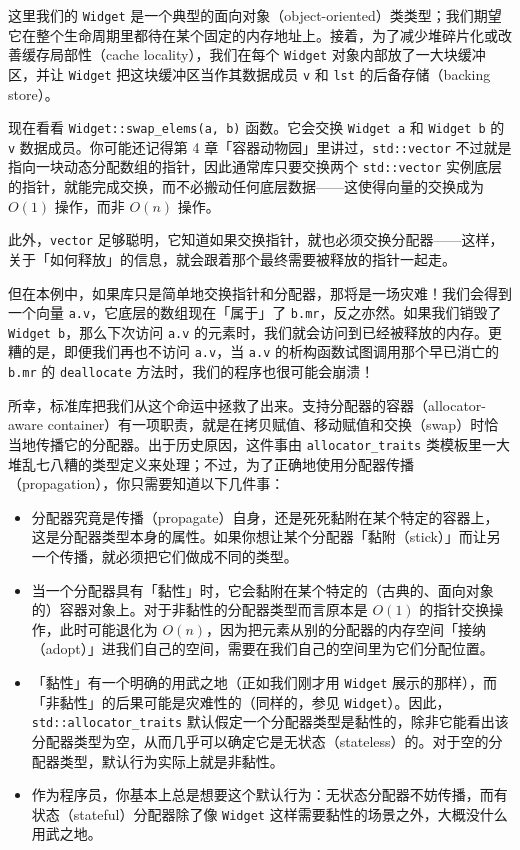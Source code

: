 这里我们的 \texttt{Widget} 是一个典型的面向对象（object-oriented）类类型；我们期望它在整个生命周期里都待在某个固定的内存地址上。接着，为了减少堆碎片化或改善缓存局部性（cache locality），我们在每个 \texttt{Widget} 对象内部放了一大块缓冲区，并让 \texttt{Widget} 把这块缓冲区当作其数据成员 \texttt{v} 和 \texttt{lst} 的后备存储（backing store）。

现在看看 \texttt{Widget::\allowbreak{}swap\_\allowbreak{}elems(\allowbreak{}a,\allowbreak{} b)\allowbreak{}} 函数。它会交换 \texttt{Widget a} 和 \texttt{Widget b} 的 \texttt{v} 数据成员。你可能还记得第 4 章「容器动物园」里讲过，\texttt{std::\allowbreak{}vector} 不过就是指向一块动态分配数组的指针，因此通常库只要交换两个 \texttt{std::\allowbreak{}vector} 实例底层的指针，就能完成交换，而不必搬动任何底层数据——这使得向量的交换成为 $O(1)$ 操作，而非 $O(n)$ 操作。

此外，\texttt{vector} 足够聪明，它知道如果交换指针，就也必须交换分配器——这样，关于「如何释放」的信息，就会跟着那个最终需要被释放的指针一起走。

但在本例中，如果库只是简单地交换指针和分配器，那将是一场灾难！我们会得到一个向量 \texttt{a.\allowbreak{}v}，它底层的数组现在「属于」了 \texttt{b.\allowbreak{}mr}，反之亦然。如果我们销毁了 \texttt{Widget b}，那么下次访问 \texttt{a.\allowbreak{}v} 的元素时，我们就会访问到已经被释放的内存。更糟的是，即便我们再也不访问 \texttt{a.\allowbreak{}v}，当 \texttt{a.\allowbreak{}v} 的析构函数试图调用那个早已消亡的 \texttt{b.\allowbreak{}mr} 的 \texttt{deallocate} 方法时，我们的程序也很可能会崩溃！

所幸，标准库把我们从这个命运中拯救了出来。支持分配器的容器（allocator-aware container）有一项职责，就是在拷贝赋值、移动赋值和交换（swap）时恰当地传播它的分配器。出于历史原因，这件事由 \texttt{allocator\_\allowbreak{}traits} 类模板里一大堆乱七八糟的类型定义来处理；不过，为了正确地使用分配器传播（propagation），你只需要知道以下几件事：

\begin{itemize}
\item 分配器究竟是传播（propagate）自身，还是死死黏附在某个特定的容器上，这是分配器类型本身的属性。如果你想让某个分配器「黏附（stick）」而让另一个传播，就必须把它们做成不同的类型。
\item 当一个分配器具有「黏性」时，它会黏附在某个特定的（古典的、面向对象的）容器对象上。对于非黏性的分配器类型而言原本是 $O(1)$ 的指针交换操作，此时可能退化为 $O(n)$，因为把元素从别的分配器的内存空间「接纳（adopt）」进我们自己的空间，需要在我们自己的空间里为它们分配位置。
\item 「黏性」有一个明确的用武之地（正如我们刚才用 \texttt{Widget} 展示的那样），而「非黏性」的后果可能是灾难性的（同样的，参见 \texttt{Widget}）。因此，\texttt{std::\allowbreak{}allocator\_\allowbreak{}traits} 默认假定一个分配器类型是黏性的，除非它能看出该分配器类型为空，从而几乎可以确定它是无状态（stateless）的。对于空的分配器类型，默认行为实际上就是非黏性。
\item 作为程序员，你基本上总是想要这个默认行为：无状态分配器不妨传播，而有状态（stateful）分配器除了像 \texttt{Widget} 这样需要黏性的场景之外，大概没什么用武之地。
\end{itemize}

